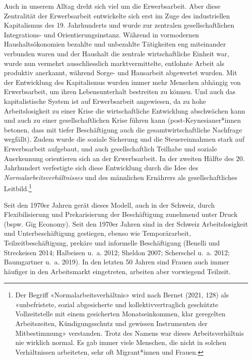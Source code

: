 \documentclass[
  nswissgerman,
  a4paper,
  DIV=11,
  numbers=noendperiod,
  oneside,
  openany]{scrreprt}
\begin{document}
Auch in unserem Alltag dreht sich viel um die Erwerbsarbeit. Aber diese
Zentralität der Erwerbsarbeit entwickelte sich erst im Zuge des
industriellen Kapitalismus des 19. Jahrhunderts und wurde zur zentralen
gesellschaftlichen Integrations- und Orientierungsinstanz. Während in
vormodernen Haushaltsökonomien bezahlte und unbezahlte Tätigkeiten eng
miteinander verbunden waren und der Haushalt die zentrale
wirtschaftliche Einheit war, wurde nun vermehrt ausschliesslich
marktvermittelte, entlohnte Arbeit als produktiv anerkannt, während
Sorge- und Hausarbeit abgewertet wurden. Mit der Entwicklung des
Kapitalismus wurden immer mehr Menschen abhängig von Erwerbsarbeit, um
ihren Lebensunterhalt bestreiten zu können. Und auch das kapitalistische
System ist auf Erwerbsarbeit angewiesen, da zu hohe Arbeitslosigkeit zu
einer Krise die wirtschaftliche Entwicklung abschwächen kann und auch zu
einer gesellschaftlichen Krise führen kann (post-Keynesianer*innen
betonen, dass mit tiefer Beschäftigung auch die gesamtwirtschaftliche
Nachfrage wegfällt). Zudem wurde die soziale Sicherung und die
Steuereinnahmen stark auf Erwerbsarbeit aufgebaut, und auch
gesellschaftlich Teilhabe und soziale Anerkennung orientieren sich an
der Erwerbsarbeit. In der zweiten Hälfte des 20. Jahrhundert verfestigte
sich diese Entwicklung durch die Idee des
\emph{Normalarbeitsverhältnisses} und des männlichen Ernährers als
gesellschaftliches Leitbild.\footnote{Der Begriff
  «Normalarbeitsverhältnis» wird nach Bernet (2021, 128) als
  «unbefristete, sozial abgesicherte und kollektivvertraglich geschützte
  Vollzeitstelle mit einem gesicherten Monatseinkommen, klar geregelten
  Arbeitszeiten, Kündigungsschutz und gewissen Instrumenten der
  Mitbestimmung» verstanden. Trotz des Namens war dieses
  Arbeitsverhältnis nie wirklich normal. Es gab immer viele Menschen,
  die nicht in solchen Verhältnissen arbeiteten, sehr oft Migrant*innen
  und Frauen.}

Seit den 1970er Jahren gerät dieses Modell, auch in der Schweiz, durch
Flexibilisierung und Prekarisierung der Beschäftigung zunehmend unter
Druck (bspw. Gig Economy). Seit den 1970er Jahren sind in der Schweiz
Arbeitslosigkeit und Unterbeschäftigung gestiegen, ebenso wie
Temporärarbeit, Teilzeitbeschäftigung, prekäre und informelle
Beschäftigung (Benelli und Streckeisen 2014; Halbeisen u.~a. 2012;
Sheldon 2007; Scherschel u.~a. 2012; Baumgartner u.~a. 2019). In den
letzten 50 Jahren sind Frauen auch immer häufiger in den Arbeitsmarkt
eingetreten, arbeiten aber vorwiegend Teilzeit.
\end{document}
